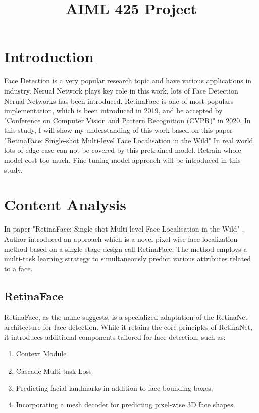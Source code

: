\documentclass{article}
\title{AIML 425 Project}
\begin{document}
%
\maketitle
%
\section{Introduction}
\label{sec:intro}

Face Detection is a very popular research topic and have various applications in industry.
Nerual Network plays key role in this work, lots of Face Detection Nerual Networks has been introduced.
RetinaFace is one of most populars implementation, which is been introduced in 2019, 
and be accepted by "Conference on Computer Vision and Pattern Recognition (CVPR)" in 2020.
In this study, I will show my understanding of this work based on this paper "RetinaFace: Single-shot Multi-level Face Localisation in the Wild" \cite{deng2020retinaface}
In real world, lots of edge case can not be covered by this pretrained model.
Retrain whole model cost too much.
Fine tuning model approach will be introduced in this study.


\section{Content Analysis}
\label{sec:content}

In paper "RetinaFace: Single-shot Multi-level Face Localisation in the Wild" \cite{deng2020retinaface}, 
Author introduced an approach which is a  novel pixel-wise face localization method based on a single-stage design call RetinaFace. 
The method employs a multi-task learning strategy to simultaneously predict various attributes related to a face. 

\subsection{RetinaFace}

RetinaFace, as the name suggests, is a specialized adaptation of the RetinaNet architecture for face detection. While it retains the core principles of RetinaNet, it introduces additional components tailored for face detection, such as:

\begin{enumerate} 
\item Context Module
\item Cascade Multi-task Loss
\item Predicting facial landmarks in addition to face bounding boxes.
\item Incorporating a mesh decoder for predicting pixel-wise 3D face shapes.
\end{enumerate}
\end{document}
